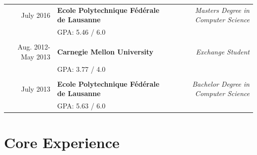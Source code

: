 \documentclass[a4paper,11pt]{article} %
\begin{document}
\begin{tabularx}{\textwidth}{r X r} 	
July 2016 & 
\textbf{Ecole Polytechnique Fédérale de Lausanne} & 
\textit{Masters Degree in Computer Science}\\
&\footnotesize \textsc{GPA}: 5.46 / 6.0\\
\\

Aug. 2012-May 2013 & 
\textbf{Carnegie Mellon University} &
\textit{Exchange Student}\\
&\footnotesize \textsc{GPA}: 3.77 / 4.0\\
\\

July 2013 & 
\textbf{Ecole Polytechnique Fédérale de Lausanne} & 
\textit{Bachelor Degree in Computer Science}\\
&\footnotesize \textsc{GPA}: 5.63 / 6.0\\


\end{tabularx}


\section{Core Experience}
\end{document}
